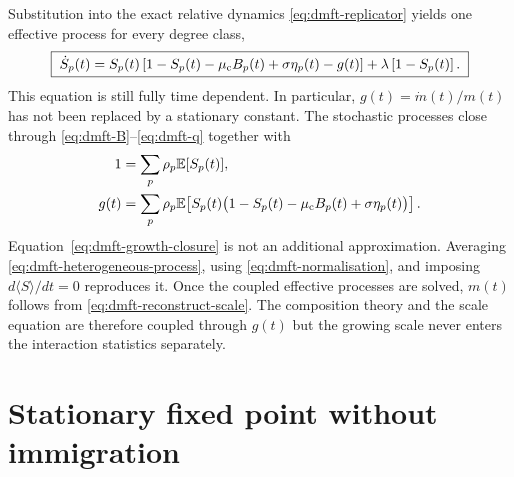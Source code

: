 Substitution into the exact relative dynamics \eqref{eq:dmft-replicator} yields one effective
process for every degree class,
\begin{equation}
    \boxed{\;
    \dot S_p(t)=S_p(t)\left[1-S_p(t)-\mu_{\rm c}B_p(t)
                       +\sigma\eta_p(t)-g(t)\right]
                    +\lambda\left[1-S_p(t)\right].
    \;}
    \label{eq:dmft-heterogeneous-process}
\end{equation}
This equation is still fully time dependent.  In particular, $g(t)=\dot m(t)/m(t)$ has not
been replaced by a stationary constant.  The stochastic processes close through
\eqref{eq:dmft-B}--\eqref{eq:dmft-q} together with
\begin{align}
    1&=\sum_p\rho_p\mathbb{E}[S_p(t)],
    \label{eq:dmft-normalisation}\\
    g(t)&=\sum_p\rho_p\mathbb{E}\!\left[
       S_p(t)\bigl(1-S_p(t)-\mu_{\rm c}B_p(t)+\sigma\eta_p(t)\bigr)
       \right].
    \label{eq:dmft-growth-closure}
\end{align}
Equation~\eqref{eq:dmft-growth-closure} is not an additional approximation.  Averaging
\eqref{eq:dmft-heterogeneous-process}, using \eqref{eq:dmft-normalisation}, and imposing
$d\langle S\rangle/dt=0$ reproduces it.  Once the coupled effective processes are solved,
$m(t)$ follows from \eqref{eq:dmft-reconstruct-scale}.  The composition theory and the scale
equation are therefore coupled through $g(t)$ but the growing scale never enters the interaction
statistics separately.

\section{Stationary fixed point without immigration}
\label{sec:dmft-fixed-point}

